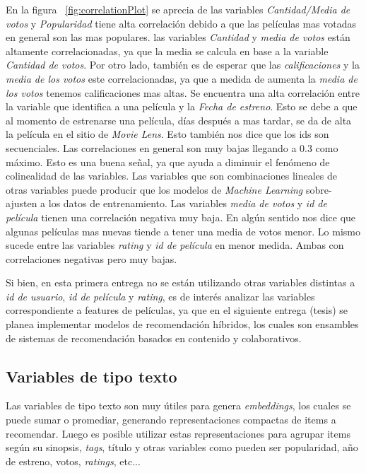 \documentclass[11pt,a4paper,twoside]{thesis}
\begin{document}
En la figura ~\ref{fig:correlationPlot} se aprecia de las variables \textit{Cantidad/Media de votos} y \textit{Popularidad} tiene alta correlación debido a que las películas mas votadas en general son las mas populares. 
las variables \textit{Cantidad} y \textit{media de votos} están altamente correlacionadas, ya que la media se calcula en base a la variable \textit{Cantidad de votos}. Por otro lado, también es de esperar que las \textit{calificaciones} y la \textit{media de los votos} este correlacionadas, ya que a medida de aumenta la \textit{media de los votos} tenemos calificaciones mas altas. Se encuentra una alta correlación entre la variable que identifica a una película y la \textit{Fecha de estreno}. Esto se debe a que al momento de estrenarse una película, días después a mas tardar, se da de alta la película en el sitio de \textit{Movie Lens}. Esto también nos dice que los ids son secuenciales.
Las correlaciones en general son muy bajas llegando a 0.3 como máximo. Esto es una buena señal, ya que ayuda a diminuir el fenómeno de colinealidad de las variables. Las variables que son combinaciones lineales de otras variables puede producir que los modelos de \textit{Machine Learning} sobre-ajusten a los datos de entrenamiento. 
Las variables \textit{media de votos} y \textit{id de película} tienen una correlación negativa muy baja. En algún sentido nos dice que algunas películas mas nuevas tiende a tener una media de votos menor. Lo mismo sucede entre las variables \textit{rating} y \textit{id de película} en menor medida. Ambas con correlaciones negativas pero muy bajas.


Si bien, en esta primera entrega no se están utilizando otras variables distintas a \textit{id de usuario}, \textit{id de película} y \textit{rating}, es de interés analizar las variables correspondiente a features de películas, ya que en el siguiente entrega (tesis) se planea implementar modelos de recomendación híbridos, los cuales son ensambles de sistemas de recomendación basados en contenido y colaborativos.

\subsection{Variables de tipo texto}

Las variables de tipo texto son muy útiles para genera \textit{embeddings}, los cuales se puede sumar o promediar, generando representaciones compactas de items a recomendar. Luego es posible utilizar estas representaciones para agrupar items según su sinopsis, \textit{tags}, título y otras variables como pueden ser popularidad, año de estreno, votos, \textit{ratings}, etc...
\end{document}
